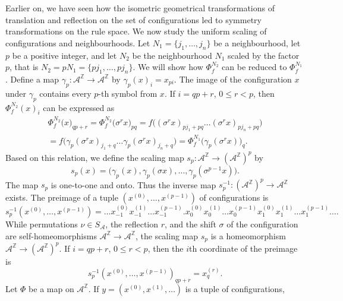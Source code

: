 \documentclass[a4paper]{article}
\begin{document}
Earlier on, we have seen how the isometric geometrical transformations of
translation and reflection on the set of configurations led to symmetry transformations on the rule space.
We now study the uniform scaling of configurations and neighbourhoods.
Let $N_1 = \{j_1, \ldots, j_{n}\} $ be a neighbourhood, let $p$ be a positive integer, and
let $N_2$ be the neighbourhood $N_1$ scaled by the factor $p$, that is
$N_2 = p N_1 = \{p j_1,\ldots,p j_{n}\}$.
We will show how $\Phi_f^{N_2}$ can be reduced to $\Phi_f^{N_1}$.
Define a map $\gamma_p: \mathcal{A}^\mathbb{Z} \to \mathcal{A}^\mathbb{Z}$  by
$\gamma_p(x)_i = x_{pi}$.
The image of the configuration $x$ under $\gamma_p$ contains every $p$-th symbol from $x$.
If $i = qp + r$, $0 \le r < p$, then $\Phi^{N_2}_f(x)_i$ can be expressed as
\begin{multline}
\label{eq:scal}
\Phi^{N_2}_f\bigl(x\bigr)_{qp+r}  =  \Phi^{N_2}_f\bigl(\sigma^r x\bigr)_{pq} =
f\bigl((\sigma^rx)_{pj_1 + pq} \ldots (\sigma^rx)_{pj_{n} + pq}\bigr) \\
 =  f\bigl( \gamma_p(\sigma^rx)_{j_1+q} \ldots \gamma_p(\sigma^rx)_{j_{n}+q}\bigr)
= \Phi^{N_1}_f\bigl(\gamma_p(\sigma^rx)\bigr)_q.
\end{multline}
Based on this relation, we define the
scaling map $s_p : \mathcal{A}^{\mathbb Z} \to (\mathcal{A}^{\mathbb Z})^p$ by
\[
s_p(x) = \bigl(\gamma_p(x), \gamma_p(\sigma x), \ldots , \gamma_p(\sigma^{p-1} x) \bigr).
\]
The map $s_p$ is one-to-one and onto.
Thus the inverse map $s_p^{-1} : (\mathcal{A}^\mathbb{Z})^p \to \mathcal{A}^\mathbb{Z}$ exists.
The preimage of a tuple $(x^{(0)}, \ldots, x^{(p-1)})$ of configurations is
\begin{equation*}
s^{-1}_p(x^{(0)}, \ldots, x^{(p-1)}) =
\ldots x^{(0)}_{-1}x^{(1)}_{-1}\ldots x^{(p-1)}_{-1}.x^{(0)}_0x^{(1)}_0 \ldots x^{(p-1)}_0
x^{(0)}_1x^{(1)}_1 \ldots x^{(p-1)}_1 \ldots.
\end{equation*}
While permutations $\nu \in S_\mathcal{A}$, the reflection $r$, and the shift $\sigma$ of the configuration
are self-homeomorphisms $\mathcal{A}^\mathbb{Z} \to \mathcal{A}^\mathbb{Z}$,
the scaling map $s_p$ is a homeomorphism $\mathcal{A}^\mathbb{Z} \to (\mathcal{A}^\mathbb{Z})^p$.
If $i = qp + r$, $0 \le r < p$, then the $i$th coordinate of the preimage is
\begin{equation}
\label{eq:idx}
s^{-1}_p(x^{(0)}, \ldots, x^{(p-1)})_{qp+r} = x^{(r)}_q.
\end{equation}
Let $\Phi$ be a map on $\mathcal{A}^{\mathbb{Z}}$.
If $y = (x^{(0)}, x^{(1)}, \ldots)$ is a tuple of configurations,
\end{document}
